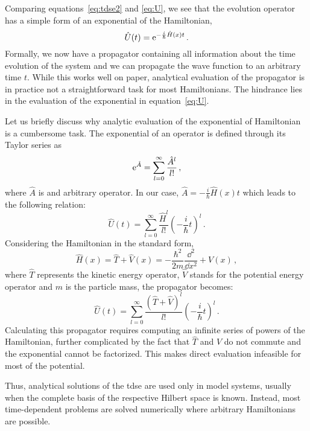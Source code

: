 Comparing equations~\eqref{eq:tdse2} and \eqref{eq:U}, we see that the evolution operator has a simple form of an exponential of the Hamiltonian,
\begin{equation}
    \hat{U}(t) = \mathrm{e}^{-\frac{i}{\hbar}\hat{H}(x)t} \, .
    \label{eq:U}
\end{equation}
Formally, we now have a propagator containing all information about the time evolution of the system and we can propagate the wave function to an arbitrary time $t$. While this works well on paper, analytical evaluation of the propagator is in practice not a straightforward task for most Hamiltonians. The hindrance lies in the evaluation of the exponential in equation~\eqref{eq:U}.

Let us briefly discuss why analytic evaluation of the exponential of Hamiltonian is a cumbersome task. The exponential of an operator is defined through its Taylor series as
\begin{equation}
    \mathrm{e}^{\hat{A}} = \sum_{l=0}^\infty \frac{\hat{A}^l}{l!} \, ,
\end{equation}
where $\hat{A}$ is and arbitrary operator. In our case, $\hat{A} = -\frac{i}{\hbar}\hat{H}(x)t$ which leads to the following relation:
\begin{equation}
    \hat{U}(t) = \sum_{l=0}^\infty \frac{\hat{H}^l}{l!} \left( -\frac{i}{\hbar} t\right)^l \, .
    \label{eq:U2}
\end{equation}
Considering the Hamiltonian in the standard form,
\begin{equation}
    \hat{H}(x) = \hat{T} + \hat{V}(x) = -\frac{\hbar^2}{2m}\frac{\dd^2}{\dd x^2} + V(x)\, ,
    \label{eq:Ham1}
\end{equation}
where $\hat{T}$ represents the kinetic energy operator, $\hat{V}$ stands for the potential energy operator and $m$ is the particle mass, the propagator becomes:
\begin{equation}
    \hat{U}(t) = \sum_{l=0}^\infty \frac{(\hat{T}+\hat{V})^l}{l!} \left( -\frac{i}{\hbar} t\right)^l \, .
    \label{eq:U3}
\end{equation}
Calculating this propagator requires computing an infinite series of powers of the Hamiltonian, further complicated by the fact that $\hat{T}$ and $\hat{V}$ do not commute and the exponential cannot be factorized. This makes direct evaluation infeasible for most of the potential.

Thus, analytical solutions of the \acrshort{tdse} are used only in model systems, usually when the complete basis of the respective Hilbert space is known. Instead, most time-dependent problems are solved numerically where arbitrary Hamiltonians are possible. 

